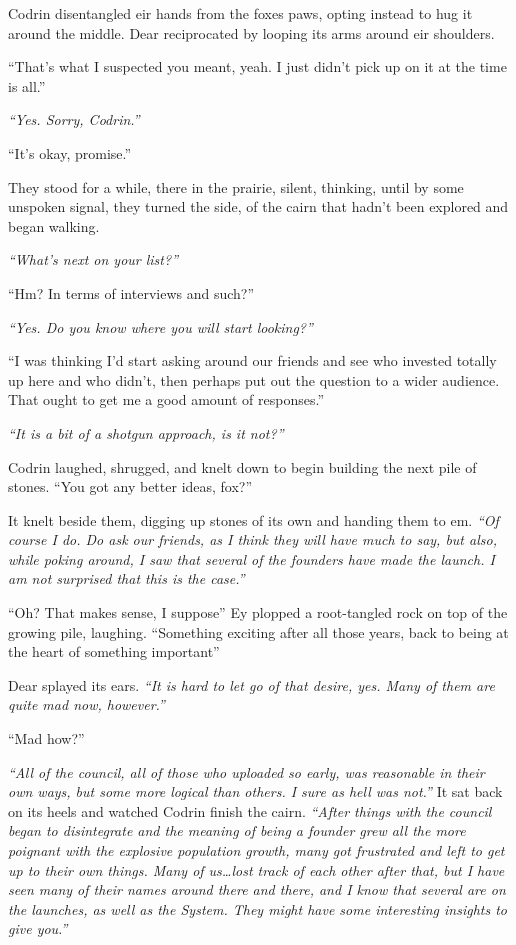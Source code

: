 Codrin disentangled eir hands from the foxes paws, opting instead to hug it around the middle. Dear reciprocated by looping its arms around eir shoulders.

``That's what I suspected you meant, yeah. I just didn't pick up on it at the time is all.''

\emph{``Yes. Sorry, Codrin.''}

``It's okay, promise.''

They stood for a while, there in the prairie, silent, thinking, until by some unspoken signal, they turned the side, of the cairn that hadn't been explored and began walking.

\emph{``What's next on your list?''}

``Hm? In terms of interviews and such?''

\emph{``Yes. Do you know where you will start looking?''}

``I was thinking I'd start asking around our friends and see who invested totally up here and who didn't, then perhaps put out the question to a wider audience. That ought to get me a good amount of responses.''

\emph{``It is a bit of a shotgun approach, is it not?''}

Codrin laughed, shrugged, and knelt down to begin building the next pile of stones. ``You got any better ideas, fox?''

It knelt beside them, digging up stones of its own and handing them to em. \emph{``Of course I do. Do ask our friends, as I think they will have much to say, but also, while poking around, I saw that several of the founders have made the launch. I am not surprised that this is the case.''}

``Oh? That makes sense, I suppose'' Ey plopped a root-tangled rock on top of the growing pile, laughing. ``Something exciting after all those years, back to being at the heart of something important''

Dear splayed its ears. \emph{``It is hard to let go of that desire, yes. Many of them are quite mad now, however.''}

``Mad how?''

\emph{``All of the council, all of those who uploaded so early, was reasonable in their own ways, but some more logical than others. I sure as hell was not.''} It sat back on its heels and watched Codrin finish the cairn. \emph{``After things with the council began to disintegrate and the meaning of being a founder grew all the more poignant with the explosive population growth, many got frustrated and left to get up to their own things. Many of us\ldots lost track of each other after that, but I have seen many of their names around there and there, and I know that several are on the launches, as well as the System. They might have some interesting insights to give you.''}

